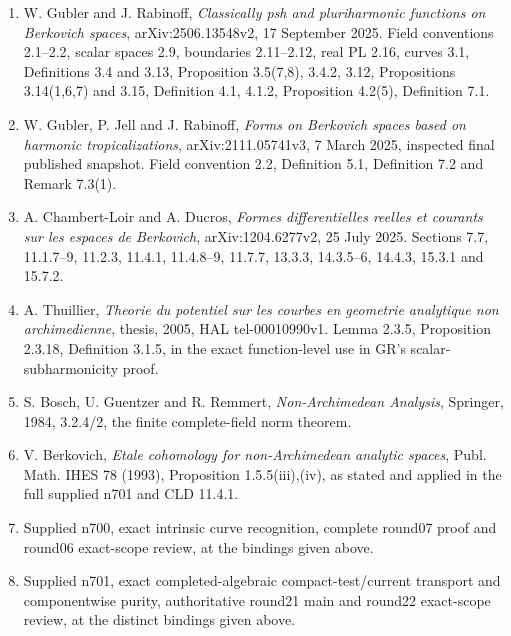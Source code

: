 \documentclass[
  11pt,
]{article}
\providecommand{\tightlist}{%
  \setlength{\itemsep}{0pt}\setlength{\parskip}{0pt}}
\begin{document}
\begin{enumerate}
\def\labelenumi{\arabic{enumi}.}
\tightlist
\item
  W. Gubler and J. Rabinoff, \emph{Classically psh and pluriharmonic
  functions on Berkovich spaces}, arXiv:2506.13548v2, 17 September 2025.
  Field conventions 2.1--2.2, scalar spaces 2.9, boundaries 2.11--2.12,
  real PL 2.16, curves 3.1, Definitions 3.4 and 3.13, Proposition
  3.5(7,8), 3.4.2, 3.12, Propositions 3.14(1,6,7) and 3.15, Definition
  4.1, 4.1.2, Proposition 4.2(5), Definition 7.1.
\item
  W. Gubler, P. Jell and J. Rabinoff, \emph{Forms on Berkovich spaces
  based on harmonic tropicalizations}, arXiv:2111.05741v3, 7 March 2025,
  inspected final published snapshot. Field convention 2.2, Definition
  5.1, Definition 7.2 and Remark 7.3(1).
\item
  A. Chambert-Loir and A. Ducros, \emph{Formes differentielles reelles
  et courants sur les espaces de Berkovich}, arXiv:1204.6277v2, 25 July
  2025. Sections 7.7, 11.1.7--9, 11.2.3, 11.4.1, 11.4.8--9, 11.7.7,
  13.3.3, 14.3.5--6, 14.4.3, 15.3.1 and 15.7.2.
\item
  A. Thuillier, \emph{Theorie du potentiel sur les courbes en geometrie
  analytique non archimedienne}, thesis, 2005, HAL tel-00010990v1. Lemma
  2.3.5, Proposition 2.3.18, Definition 3.1.5, in the exact
  function-level use in GR's scalar-subharmonicity proof.
\item
  S. Bosch, U. Guentzer and R. Remmert, \emph{Non-Archimedean Analysis},
  Springer, 1984, 3.2.4/2, the finite complete-field norm theorem.
\item
  V. Berkovich, \emph{Etale cohomology for non-Archimedean analytic
  spaces}, Publ. Math. IHES 78 (1993), Proposition 1.5.5(iii),(iv), as
  stated and applied in the full supplied n701 and CLD 11.4.1.
\item
  Supplied n700, exact intrinsic curve recognition, complete round07
  proof and round06 exact-scope review, at the bindings given above.
\item
  Supplied n701, exact completed-algebraic compact-test/current
  transport and componentwise purity, authoritative round21 main and
  round22 exact-scope review, at the distinct bindings given above.
\end{enumerate}
\end{document}
